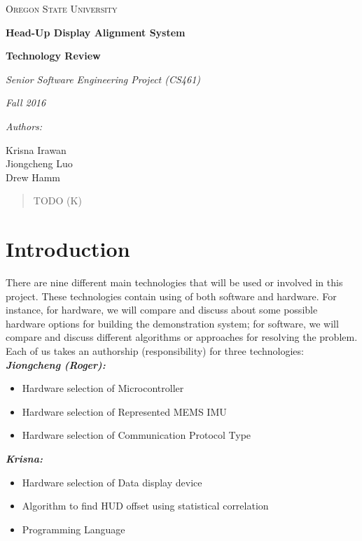 \documentclass[letterpaper,10pt,onecolumn]{IEEEtran}
\def\name{Krisna Irawan\\ Jiongcheng Luo\\ Drew Hamm}
\def\doc{Technology Review}
\begin{document}
\begin{titlepage}
	\centering
	{\scshape\LARGE Oregon State University\par}
	\vspace{2cm}
	{\huge\bfseries Head-Up Display Alignment System\par}
	\vspace{1cm}
	{\Large\bfseries \doc\par}
	\vspace{1cm}
	{\Large\itshape Senior Software Engineering Project (CS461)\par}
	{\Large\itshape Fall 2016\par}
	\vspace{1cm}
	{\normalsize\itshape Authors:\par}
	{\normalsize \name\par}
	\vspace{1cm}
	\vspace{3cm}


	\begin{abstract}
		TODO (K)
	\end{abstract}
\end{titlepage}
\tableofcontents

\newpage
\section{Introduction}
There are nine different main technologies that will be used or involved in this project. These technologies contain using of both software and hardware. For instance, for hardware, we will compare and discuss about some possible hardware options for building the demonstration system; for software, we will compare and discuss different algorithms or approaches for resolving the problem. Each of us takes an authorship (responsibility) for three technologies:\\

\textit{\textbf{Jiongcheng (Roger):}}
\begin{itemize}
	\item Hardware selection of Microcontroller
	\item Hardware selection of Represented MEMS IMU
	\item Hardware selection of Communication Protocol Type
\end{itemize}

\textit{\textbf{Krisna:}}
\begin{itemize}
	\item Hardware selection of Data display device
	\item Algorithm to find HUD offset using statistical correlation
	\item Programming Language
\end{itemize}
\end{document}
